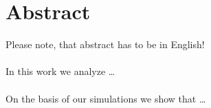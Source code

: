 \chapter*{Abstract}
Please note, that abstract has to be in English! \\
\\
%
In this work we analyze \ldots
\\
\\
On the basis of our simulations we show that \ldots

